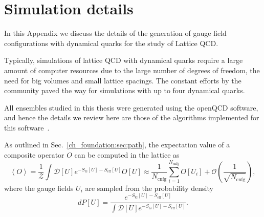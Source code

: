 
\chapter{Simulation details}
\label{appex_simulations}

In this Appendix we discuss the details of the generation of gauge field configurations with dynamical quarks for the study of Lattice QCD. 

Typically, simulations of lattice QCD with dynamical quarks require a large amount of computer resources due to the large number of degrees of freedom, the need for big volumes and small lattice spacings. The constant efforts by the community paved the way for simulations with up to four dynamical quarks. 

All ensembles studied in this thesis were generated using the openQCD software, and hence the details we review here are those of the algorithms implemented for this software~\citep{Luscher:2012av,Luscher:2010ae}.

As outlined in Sec.~\ref{ch_foundation:sec:path}, the expectation value of a composite operator $O$ can be computed in the lattice as
\begin{equation}
\left<O\right>=\frac{1}{\mathcal{Z}}\int\mathcal{D}[U]e^{-S_{\textrm{G}}[U]-S_{\textrm{eff}}[U]}O[U]\approx\frac{1}{N_{\textrm{cnfg}}}\sum_{i=1}^{N_{\textrm{cnfg}}}O[U_i]+\mathcal{O}\left(\frac{1}{\sqrt{N_{\textrm{cnfg}}}}\right),
\end{equation}
where the gauge fields $U_i$ are sampled from the probability density
\begin{equation}
\label{appex_simulations:eq:PU}
dP[U]=\frac{e^{-S_{\textrm{G}}[U]-S_{\textrm{eff}}[U]}}{\int\mathcal{D}[U]e^{-S_{\textrm{G}}[U]-S_{\textrm{eff}}[U]}}.
\end{equation}


